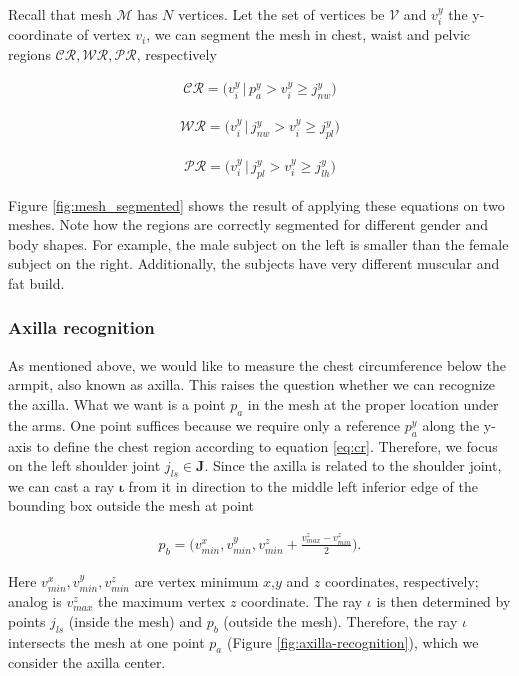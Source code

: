 \documentclass[runningheads, orivec]{llncs}
\begin{document}
Recall that mesh $\mathcal{M}$ has $N$ vertices. Let the set of vertices be 
$\mathcal{V}$ and $v^y_i$ the y-coordinate of vertex $v_i$, we can 
segment the 
mesh in chest, waist and pelvic regions 
$\mathcal{CR}, \mathcal{WR}, \mathcal{PR}$, respectively

\begin{align}\label{eq:cr}
\mathcal{CR} = \big(v^y_i \, | \, p^y_a > v^y_i \geq j^y_{nw} \big)
\end{align}

\begin{align}\label{eq:wr}
\mathcal{WR} = \big(v^y_i \, | \, j^y_{nw} > v^y_i \geq j^y_{pl}\big)
\end{align}

\begin{align}\label{eq:pr}
\mathcal{PR} = \big(v^y_i \, | \, j^y_{pl} > v^y_i \geq j^y_{lh}\big)
\end{align}

Figure \ref{fig:mesh_segmented} shows the result of applying these equations on 
two meshes. Note how the regions are correctly segmented for different gender 
and body shapes. For example, the male subject on the left is smaller than the 
female subject on the right. Additionally, the subjects have very different 
muscular and fat build.

\subsubsection{Axilla recognition}\label{subsec:armpit_recog}
As mentioned above, we would like to measure the chest circumference below the 
armpit, also known as axilla. This raises the question whether we can recognize 
the axilla. What we want is a point $p_a$ in the mesh at the proper location 
under 
the arms. One point suffices because we require only a reference $p^y_a$ along 
the 
y-axis to define the chest region according to equation \ref{eq:cr}. Therefore, 
we focus on the left shoulder joint $j_{ls} \in \mathbf{J}$. Since the axilla 
is related to 
the shoulder joint, we can cast a ray $\boldsymbol{\iota}$ from it in direction 
to the middle left 
inferior edge of the bounding box outside the mesh at point

\begin{align}
p_b = \bigg(v^x_{min}, v^y_{min}, v^z_{min} + 
\frac{v^z_{max} - v^z_{min}}{2}\bigg).
\end{align}

Here $v^x_{min}, v^y_{min}, v^z_{min}$ are vertex minimum $x$,$y$ and $z$ 
coordinates, respectively; analog is $v^z_{max}$ the maximum vertex $z$ 
coordinate. The ray 
$\iota$ is then determined by points $j_{ls}$ (inside the mesh) and $p_b$ 
(outside the mesh). Therefore, the ray $\iota$ intersects the mesh at one point 
$p_a$ (Figure \ref{fig:axilla-recognition}), which we consider the axilla 
center.
\end{document}

